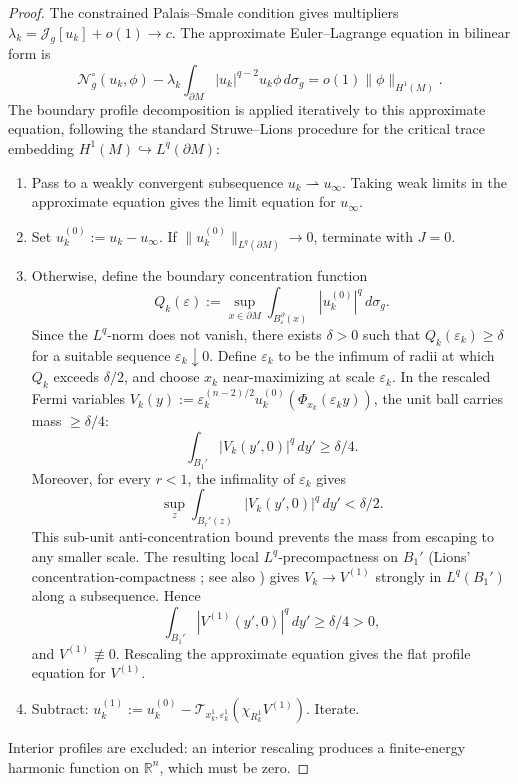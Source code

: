 \documentclass[11pt,reqno,a4paper]{amsart}
\newcommand{\R}{\mathbb{R}}
\numberwithin{equation}{section}
\theoremstyle{plain}
\theoremstyle{remark}
\theoremstyle{plain}
\begin{document}
\begin{proof}
The constrained Palais--Smale condition gives multipliers
$\lambda_k=\mathcal J_g[u_k]+o(1)\to c$.  The approximate Euler--Lagrange
equation in bilinear form is
\[
\mathcal N_g^\circ(u_k,\phi)
-
\lambda_k
\int_{\partial M}|u_k|^{q-2}u_k\phi\,d\sigma_g
=
o(1)\|\phi\|_{H^1(M)}.
\]
The boundary profile decomposition is applied iteratively to this approximate
equation, following the standard Struwe--Lions procedure for the critical
trace embedding $H^1(M)\hookrightarrow L^q(\partial M)$:
\begin{enumerate}[label=\textup{(\roman*)},leftmargin=2em]
\item Pass to a weakly convergent subsequence $u_k\rightharpoonup u_\infty$.
      Taking weak limits in the approximate equation gives the limit equation
      for $u_\infty$.
\item Set $u_k^{(0)}:=u_k-u_\infty$.  If $\|u_k^{(0)}\|_{L^q(\partial M)}\to0$,
      terminate with $J=0$.
\item Otherwise, define the boundary concentration function
      \[
      Q_k(\varepsilon)
      :=
      \sup_{x\in\partial M}
      \int_{B_\varepsilon^\partial(x)}|u_k^{(0)}|^q\,d\sigma_g .
      \]
      Since the $L^q$-norm does not vanish, there exists $\delta>0$ such that
      $Q_k(\varepsilon_k)\ge\delta$ for a suitable sequence
      $\varepsilon_k\downarrow0$.  Define $\varepsilon_k$ to be the infimum of
      radii at which $Q_k$ exceeds $\delta/2$, and choose $x_k$
      near-maximizing at scale $\varepsilon_k$.  In the rescaled Fermi
      variables
      $V_k(y):=\varepsilon_k^{(n-2)/2}u_k^{(0)}(\Phi_{x_k}(\varepsilon_k y))$,
      the unit ball carries mass $\ge\delta/4$:
      \[
      \int_{B_1'}|V_k(y',0)|^q\,dy'\ge\delta/4.
      \]
      Moreover, for every $r<1$, the infimality of $\varepsilon_k$ gives
      \[
      \sup_z
      \int_{B_r'(z)}|V_k(y',0)|^q\,dy'
      <\delta/2.
      \]
      This sub-unit anti-concentration bound prevents the mass from escaping to
      any smaller scale.  The resulting local $L^q$-precompactness on $B_1'$
      (Lions' concentration-compactness \cite{Lions85a,Lions84I}; see also \cite{Struwe1984})
      gives $V_k\to V^{(1)}$ strongly in $L^q(B_1')$ along a subsequence.
      Hence
      \[
      \int_{B_1'}|V^{(1)}(y',0)|^q\,dy'\ge\delta/4>0,
      \]
      and $V^{(1)}\not\equiv0$.  Rescaling the approximate equation gives the
      flat profile equation for $V^{(1)}$.
\item Subtract: $u_k^{(1)}:=u_k^{(0)}-\mathcal T_{x_k^1,\varepsilon_k^1}(\chi_{R_k^1}V^{(1)})$.
      Iterate.
\end{enumerate}
Interior profiles are excluded: an interior rescaling produces a finite-energy
harmonic function on $\R^n$, which must be zero.


\end{proof}
\end{document}
